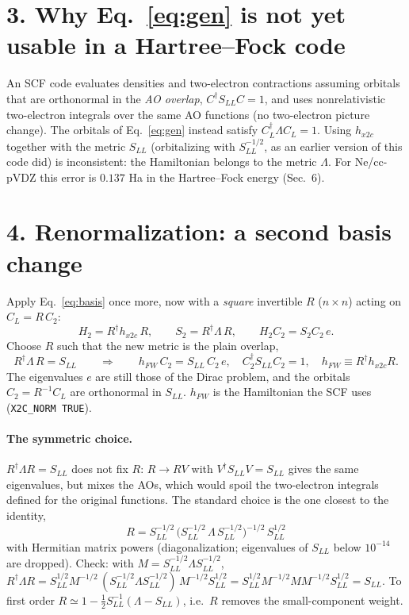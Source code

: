 \documentclass[11pt]{article}
\newcommand{\dg}{^{\dagger}}
\begin{document}
\section*{3. Why Eq.~\eqref{eq:gen} is not yet usable in a Hartree--Fock code}

An SCF code evaluates densities and two-electron contractions assuming orbitals that are orthonormal in the
\emph{AO overlap}, $C\dg S_{LL}C = 1$, and uses nonrelativistic two-electron integrals over the same AO functions
(no two-electron picture change). The orbitals of Eq.~\eqref{eq:gen} instead satisfy $C_L\dg\Lambda C_L=1$. Using
$h_{x2c}$ together with the metric $S_{LL}$ (orbitalizing with $S_{LL}^{-1/2}$, as an earlier version of this code
did) is inconsistent: the Hamiltonian belongs to the metric $\Lambda$. For Ne/cc-pVDZ this error is $0.137$ Ha in
the Hartree--Fock energy (Sec.~6).

\section*{4. Renormalization: a second basis change}

Apply Eq.~\eqref{eq:basis} once more, now with a \emph{square} invertible $R$ ($n\times n$) acting on $C_L = R\,C_2$:
\begin{equation}
H_2 = R\dg h_{x2c}\,R,\qquad S_2 = R\dg\Lambda\,R,\qquad H_2 C_2 = S_2 C_2\, e .
\end{equation}
Choose $R$ such that the new metric is the plain overlap,
\begin{equation}
R\dg \Lambda\, R = S_{LL}\qquad\Longrightarrow\qquad
h_{FW}\,C_2 = S_{LL}\,C_2\, e,\quad C_2\dg S_{LL}C_2=1,\quad h_{FW}\equiv R\dg h_{x2c}R .
\label{eq:hfw}
\end{equation}
The eigenvalues $e$ are still those of the Dirac problem, and the orbitals $C_2=R^{-1}C_L$ are orthonormal in
$S_{LL}$. $h_{FW}$ is the Hamiltonian the SCF uses (\texttt{X2C\_NORM TRUE}).

\paragraph{The symmetric choice.}
$R\dg\Lambda R=S_{LL}$ does not fix $R$: $R\to RV$ with $V\dg S_{LL}V = S_{LL}$ gives the same eigenvalues, but
mixes the AOs, which would spoil the two-electron integrals defined for the original functions. The standard
choice is the one closest to the identity,
\begin{equation}
\boxed{\;R = S_{LL}^{-1/2}\,\bigl(S_{LL}^{-1/2}\,\Lambda\,S_{LL}^{-1/2}\bigr)^{-1/2}\,S_{LL}^{1/2}\;}
\label{eq:R}
\end{equation}
with Hermitian matrix powers (diagonalization; eigenvalues of $S_{LL}$ below $10^{-14}$ are dropped).
Check: with $M = S_{LL}^{-1/2}\Lambda S_{LL}^{-1/2}$,
$R\dg\Lambda R = S_{LL}^{1/2}M^{-1/2}\,(S_{LL}^{-1/2}\Lambda S_{LL}^{-1/2})\,M^{-1/2}S_{LL}^{1/2}
= S_{LL}^{1/2}M^{-1/2}MM^{-1/2}S_{LL}^{1/2} = S_{LL}$.
To first order $R\simeq 1-\tfrac12 S_{LL}^{-1}(\Lambda-S_{LL})$, i.e.\ $R$ removes the small-component weight.
\end{document}
